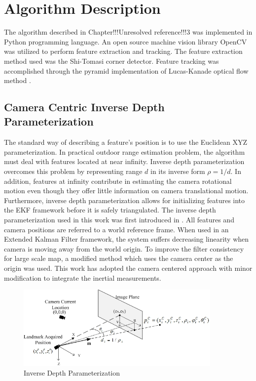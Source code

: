 \chapter{Algorithm Description}

The algorithm described in Chapter!!!Unresolved reference!!!3 was 
implemented in Python programming language. An open source machine 
vision library OpenCV was utilized to perform feature extraction and 
tracking. The feature extraction method used was the Shi-Tomasi corner 
detector. Feature tracking was accomplished through the pyramid 
implementation of Lucas-Kanade optical flow method . 

\section{Camera Centric Inverse Depth Parameterization}
The standard way of describing a feature's position is to use the 
Euclidean XYZ parameterization. In practical outdoor range estimation 
problem, the algorithm must deal with features located at near infinity. 
Inverse depth parameterization overcomes this problem by representing 
range $d$ in its inverse form $\rho =1/d$. In addition, features at 
infinity contribute in estimating the camera rotational motion even 
though they offer little information on camera translational motion. 
Furthermore, inverse depth parameterization allows for initializing 
features into the EKF framework before it is safely triangulated. The inverse depth parameterization used in this work was first
introduced in \cite{civera_inverse_2008}. All features and camera
positions are referred to a world reference frame. When used in an
Extended Kalman Filter framework, the system suffers decreasing
linearity when camera is moving away from the world origin.
To improve the filter consistency for large scale map, a modified
method which uses the camera center as the origin\cite{civera_1-point_2009} was used. This work has adopted the camera centered
approach with minor modification to integrate the inertial
measurements.

\begin{figure}[h]
\centering
\includegraphics[width=10cm, keepaspectratio=true]{./Figures/idp.jpg}
\caption{Inverse Depth Parameterization}
\label{fig:algo1}
\end{figure}

